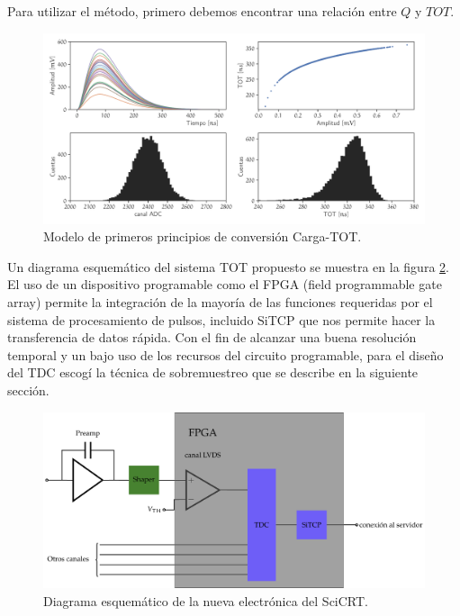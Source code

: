 Para utilizar el método, primero debemos encontrar una relación entre $Q$ y $TOT$.


\begin{figure}
        \centering
        \includegraphics[width=\textwidth]{TOT-model.pdf}
        \caption{Modelo de primeros principios de conversión Carga-TOT.}
        \label{fig:tot-model}
\end{figure}

Un diagrama esquemático del sistema TOT propuesto se muestra en la figura \ref{fig:nfeb-prot}. El uso de un dispositivo programable como el FPGA (field programmable gate array) permite la integración de la mayoría de las funciones requeridas por el sistema de procesamiento de pulsos, incluido SiTCP que nos permite hacer la transferencia de datos rápida. Con el fin de alcanzar una buena resolución temporal y un bajo uso de los recursos del circuito programable, para el diseño del TDC escogí la técnica de sobremuestreo que se describe en la siguiente sección.

\begin{figure}
        \centering
        \includegraphics[width=\textwidth]{nfeb-prot.pdf}
        \caption{Diagrama esquemático de la nueva electrónica del SciCRT.}
        \label{fig:nfeb-prot}
\end{figure}

